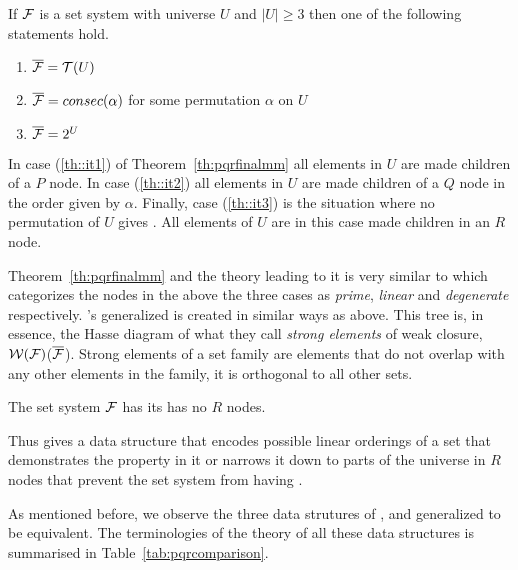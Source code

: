 \begin{theoremsansproof}[{\cite[Th.~9]{mm96}}] %
\label{th:pqrfinalmm}
If ${\cal F}$ is a set system with universe $U$ and $|U| \ge 3$ then one of
the following statements hold.
\begin{enumerate}
\item \label{th::it1} $\overline{{\cal F}} = {\cal T}(U)$ 
\item \label{th::it2}$\overline{{\cal F}} = consec(\alpha)$ for
  some permutation $\alpha$ on $U$ 
\item \label{th::it3}$\overline{{\cal F}} = 2^{U}$ 
\end{enumerate}
\end{theoremsansproof}

In case (\ref{th::it1}) of Theorem~\ref{th:pqrfinalmm} all elements in
$U$ are made children of a $P$ node. In case (\ref{th::it2}) all
elements in $U$ are made children of a $Q$ node in the order given by
$\alpha$. Finally, case (\ref{th::it3}) is the situation where no permutation
of $U$ gives \COP. All elements of $U$ are in this case made children
in an $R$ node.

Theorem~\ref{th:pqrfinalmm} and the theory leading to it is very
similar to \cite[esp. Th.~2.1, 3.5. also Th.~3.2, 3.3, 3.4]{mcc04}
which categorizes the nodes in the above the three cases as {\em
  prime}, {\em linear} and {\em degenerate}
respectively. \cite{mcc04}'s generalized \PQtree is created in similar
ways as \PQRtree above. This tree is, in essence, the Hasse diagram of
what they call {\em strong elements} of weak closure,
${\cal W}({\cal F})$(\ie $\overline{{\cal F}}$). Strong elements of a set
family are elements that do not overlap with any other elements in the
family, \ie it is orthogonal to all other sets\cite[Def.~3.3]{mcc04}.

\begin{theoremsansproof}
The set system ${\cal F}$ has \COP \iff its \PQRtree has no $R$ nodes.  
\end{theoremsansproof}

Thus \PQRtree gives a data structure that encodes possible linear
orderings of a set that demonstrates the \COP property in it or
narrows it down to parts of the universe in $R$ nodes that prevent the
set system from having \COP.

As mentioned before, we observe the three data strutures of \PQRtree,
\gPQtree and generalized \PQtree to be equivalent. The terminologies
of the theory of all these data structures is summarised in
Table~\ref{tab:pqrcomparison}.


